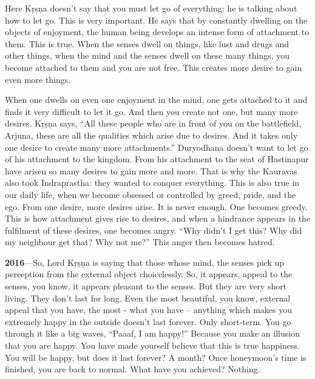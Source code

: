 Here Kṛṣṇa doesn’t say that you must let go of everything: he is talking about how to let go. This is very important. He says that by constantly dwelling on the objects of enjoyment, the human being develops an intense form of attachment to them. This is true. When the senses dwell on things, like lust and drugs and other things, when the mind and the senses dwell on these many things, you become attached to them and you are not free. This creates more desire to gain even more things.

When one dwells on even one enjoyment in the mind, one gets attached to it and finds it very difficult to let it go. And then you create not one, but many more desires. Kṛṣṇa says, “All these people who are in front of you on the battlefield, Arjuna, these are all the qualities which arise due to desires. And it takes only one desire to create many more attachments.” Duryodhana doesn’t want to let go of his attachment to the kingdom. From his attachment to the seat of Hastinapur have arisen so many desires to gain more and more. That is why the Kauravas also took Indraprastha: they wanted to conquer everything. This is also true in our daily life, when we become obsessed or controlled by greed, pride, and the ego. From one desire, more desires arise. It is never enough. One becomes greedy. This is how attachment gives rise to desires, and when a hindrance appears in the fulfilment of these desires, one becomes angry. “Why didn’t I get this? Why did my neighbour get that? Why not me?” This anger then becomes hatred.

\textbf{2016}---So, Lord Kṛṣṇa is saying that those whose mind, the senses pick up perception from the external object choicelessly. So, it appears, appeal to the senses, you know, it appears pleasant to the senses. But they are very short living. They don’t last for long. Even the most beautiful, you know, external appeal that you have, the most - what you have – anything which makes you extremely happy in the outside doesn’t last forever. Only short-term. You go through it like a big waves, “Paaaf, I am happy!” Because you make an illusion that you are happy. You have made yourself believe that this is true happiness. You will be happy, but does it last forever? A month? Once honeymoon’s time is finished, you are back to normal. What have you achieved? Nothing.

